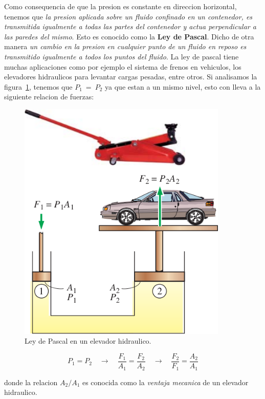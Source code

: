 \documentclass[10pt, oneside]{article}
\begin{document}
Como consequencia de que la presion es constante en direccion horizontal, tenemos que \textit{la presion aplicada sobre un fluido confinado en un contenedor, es transmitida igualmente a todas las partes del contenedor y actua perpendicular a las paredes del mismo}. Esto es conocido como la \textbf{Ley de Pascal}. Dicho de otra manera \textit{un cambio en la presion en cualquier punto de un fluido en reposo es transmitido igualmente a todos los puntos del fluido}. La ley de pascal tiene muchas aplicaciones como por ejemplo el sistema de frenos en vehiculos, los elevadores hidraulicos para levantar cargas pesadas, entre otros. Si analisamos la figura~\ref{pres4}, tenemos que $P_1 \ =\ P_2$ ya que estan a un mismo nivel, esto con lleva a la siguiente relacion de fuerzas:

\begin{figure}[h]
\centering
\includegraphics[width=10cm]{pres4}
\caption{Ley de Pascal en un elevador hidraulico.}
\label{pres4}
\end{figure}

\begin{equation}
P_1 = P_2 \quad \rightarrow \quad \frac{F_1}{A_1}=\frac{F_2}{A_2} \quad \rightarrow \quad \frac{F_2}{F_1}=\frac{A_2}{A_1}
\label{ppr6}
\end{equation}

donde la relacion $A_2 / A_1$ es conocida como la \textit{ventaja mecanica} de un elevador hidraulico.
\end{document}
